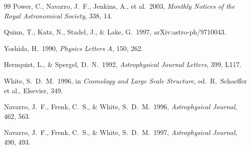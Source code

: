 \documentclass[twocolumn,linenumbers]{aastex701}
\begin{document}
\begin{thebibliography}{99}
Power, C., Navarro, J.~F., Jenkins, A., et al.\ 2003,
\textit{Monthly Notices of the Royal Astronomical Society}, 338, 14.

Quinn, T., Katz, N., Stadel, J., \& Lake, G.\ 1997,
arXiv:astro-ph/9710043.

Yoshida, H.\ 1990, \textit{Physics Letters A}, 150, 262.

Hernquist, L., \& Spergel, D.~N.\ 1992,
\textit{Astrophysical Journal Letters}, 399, L117.

White, S.~D.~M.\ 1996, in \textit{Cosmology and Large Scale Structure},
ed.\ R.~Schaeffer et al., Elsevier, 349.

Navarro, J.~F., Frenk, C.~S., \& White, S.~D.~M.\ 1996,
\textit{Astrophysical Journal}, 462, 563.

Navarro, J.~F., Frenk, C.~S., \& White, S.~D.~M.\ 1997,
\textit{Astrophysical Journal}, 490, 493.

\end{thebibliography}
\end{document}
